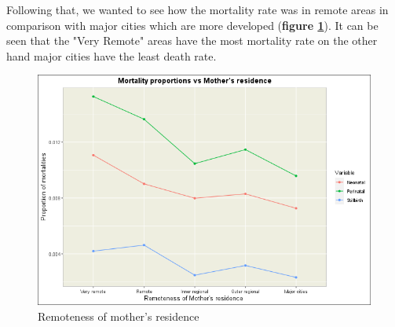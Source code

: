Following that, we wanted to see how the mortality rate was in remote areas in comparison with major cities which are more developed (\textbf{figure \ref{fig:mother_res_remoteness}}). It can be seen that the "Very Remote" areas have the most mortality rate on the other hand major cities have the least death rate.

\begin{figure}
  \centering
  \includegraphics[width=.75\textwidth]{img/aus/kanishka/mortality_mothers_res.png}
  \caption{Remoteness of mother's residence}
  \label{fig:mother_res_remoteness}
\end{figure}